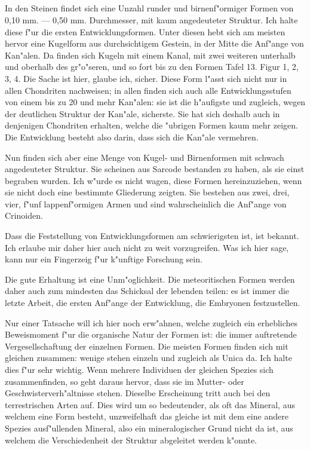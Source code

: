 \documentclass[a4paper, 11pt, oneside]{article}
\begin{document}
\subsection{}
\paragraph{}
In den Steinen findet sich eine Unzahl runder und birnenf"ormiger Formen von 0,10 mm. --- 0,50 mm. Durchmesser, mit kaum angedeuteter Struktur. Ich halte diese f"ur die ersten Entwicklungsformen. Unter diesen hebt sich am meisten hervor eine Kugelform aus durchsichtigem Gestein, in der Mitte die Anf"ange von Kan"alen. Da finden sich Kugeln mit einem Kanal, mit zwei weiteren unterhalb und oberhalb des gr"o"seren, und so fort bis zu den Formen Tafel 13. Figur 1, 2, 3, 4. Die Sache ist hier, glaube ich, sicher. Diese Form l"asst sich nicht nur in allen Chondriten nachweisen; in allen finden sich auch alle Entwicklungsstufen von einem bis zu 20 und mehr Kan"alen: sie ist die h"aufigste und zugleich, wegen der deutlichen Struktur der Kan"ale, sicherste. Sie hat sich deshalb auch in denjenigen Chondriten erhalten, welche die "ubrigen Formen kaum mehr zeigen. Die Entwicklung besteht also darin, dass sich die Kan"ale vermehren.

Nun finden sich aber eine Menge von Kugel- und Birnenformen mit schwach angedeuteter Struktur. Sie scheinen aus Sarcode bestanden zu haben, als sie einst begraben wurden. Ich w"urde es nicht wagen, diese Formen hereinzuziehen, wenn sie nicht doch eine bestimmte Gliederung zeigten. Sie bestehen aus zwei, drei, vier, f"unf lappenf"ormigen Armen und sind wahrscheinlich die Anf"ange von Crinoiden.

Dass die Feststellung von Entwicklungsformen am schwierigsten ist, ist bekannt. Ich erlaube mir daher hier auch nicht zu weit vorzugreifen. Was ich hier sage, kann nur ein Fingerzeig f"ur k"unftige Forschung sein.

Die gute Erhaltung ist eine Unm"oglichkeit. Die meteoritischen Formen werden daher auch zum mindesten das Schicksal der lebenden teilen: es ist immer die letzte Arbeit, die ersten Anf"ange der Entwicklung, die Embryonen festzustellen.

Nur einer Tatsache will ich hier noch erw"ahnen, welche zugleich ein erhebliches Beweismoment f"ur die organische Natur der Formen ist: die immer auftretende Vergesellschaftung der einzelnen Formen. Die meisten Formen finden sich mit gleichen zusammen: wenige stehen einzeln und zugleich als Unica da. Ich halte dies f"ur sehr wichtig. Wenn mehrere Individuen der gleichen Spezies sich zusammenfinden, so geht daraus hervor, dass sie im Mutter- oder Geschwisterverh"altnisse stehen. Dieselbe Erscheinung tritt auch bei den terrestrischen Arten auf. Dies wird um so bedeutender, als oft das Mineral, aus welchem eine Form besteht, unzweifelhaft das gleiche ist mit dem eine andere Spezies ausf"ullenden Mineral, also ein mineralogischer Grund nicht da ist, aus welchem die Verschiedenheit der Struktur abgeleitet werden k"onnte.
\clearpage
\end{document}
